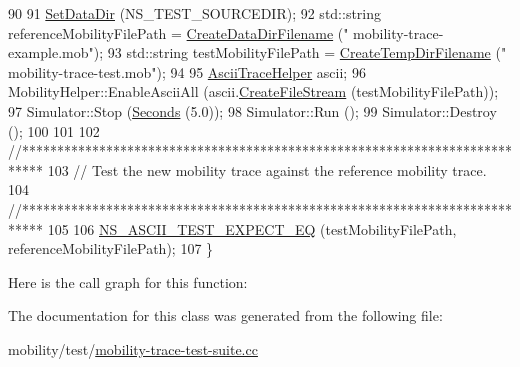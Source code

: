 \begin{DoxyCode}
90 
91   \hyperlink{classns3_1_1TestCase_ab002fb0e5071fcde71a92ca9e8224b23}{SetDataDir} (NS\_TEST\_SOURCEDIR);
92   std::string referenceMobilityFilePath = \hyperlink{classns3_1_1TestCase_a3e4d216ff392a43418f26bb3e5b0f16d}{CreateDataDirFilename} (\textcolor{stringliteral}{"
      mobility-trace-example.mob"});
93   std::string testMobilityFilePath      = \hyperlink{classns3_1_1TestCase_a8a04695a6fb9ba0f89e28e9523963f88}{CreateTempDirFilename} (\textcolor{stringliteral}{"
      mobility-trace-test.mob"});
94 
95   \hyperlink{classns3_1_1AsciiTraceHelper}{AsciiTraceHelper} ascii;
96   MobilityHelper::EnableAsciiAll (ascii.\hyperlink{classns3_1_1AsciiTraceHelper_a44960bf2ca32835024eaedd26d1c4f94}{CreateFileStream} (testMobilityFilePath));
97   Simulator::Stop (\hyperlink{group__timecivil_ga33c34b816f8ff6628e33d5c8e9713b9e}{Seconds} (5.0));
98   Simulator::Run ();
99   Simulator::Destroy ();
100 
101 
102   \textcolor{comment}{//***************************************************************************}
103   \textcolor{comment}{// Test the new mobility trace against the reference mobility trace.}
104   \textcolor{comment}{//***************************************************************************}
105 
106   \hyperlink{ascii-test_8h_a6e939f2cd8a620a9806147b989fbaf5a}{NS\_ASCII\_TEST\_EXPECT\_EQ} (testMobilityFilePath, referenceMobilityFilePath);
107 \}
\end{DoxyCode}


Here is the call graph for this function\+:




The documentation for this class was generated from the following file\+:\begin{DoxyCompactItemize}
\item 
mobility/test/\hyperlink{mobility-trace-test-suite_8cc}{mobility-\/trace-\/test-\/suite.\+cc}\end{DoxyCompactItemize}
